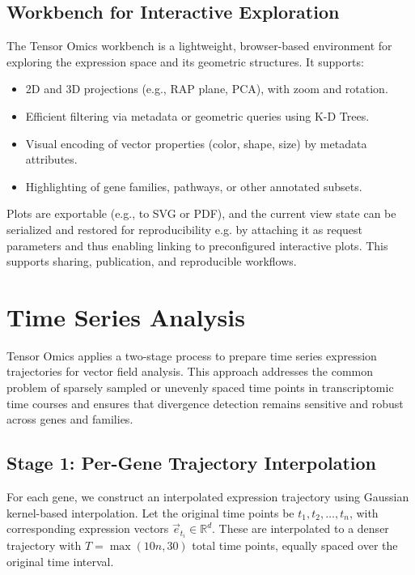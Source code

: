 \documentclass{article}
\begin{document}
\subsection{Workbench for Interactive Exploration}
\label{sec:workbench}

The Tensor Omics workbench is a lightweight, browser-based environment for exploring the expression space and its geometric structures. It supports:

\begin{itemize}
    \item 2D and 3D projections (e.g., RAP plane, PCA), with zoom and rotation.
    \item Efficient filtering via metadata or geometric queries using K-D Trees.
    \item Visual encoding of vector properties (color, shape, size) by metadata attributes.
    \item Highlighting of gene families, pathways, or other annotated subsets.
\end{itemize}

Plots are exportable (e.g., to SVG or PDF), and the current view state can be
serialized and restored for reproducibility e.g. by attaching it as request
parameters and thus enabling linking to preconfigured interactive plots. This
supports sharing, publication, and reproducible workflows.

\section{Time Series Analysis}
\label{sec:time_series_smoothing}

Tensor Omics applies a two-stage process to prepare time series expression trajectories for vector field analysis. This approach addresses the common problem of sparsely sampled or unevenly spaced time points in transcriptomic time courses and ensures that divergence detection remains sensitive and robust across genes and families.

\subsection{Stage 1: Per-Gene Trajectory Interpolation}

For each gene, we construct an interpolated expression trajectory using Gaussian kernel-based interpolation. Let the original time points be \( t_1, t_2, \dots, t_n \), with corresponding expression vectors \( \vec{e}_{t_i} \in \mathbb{R}^d \). These are interpolated to a denser trajectory with \( T = \max(10n, 30) \) total time points, equally spaced over the original time interval.
\end{document}
